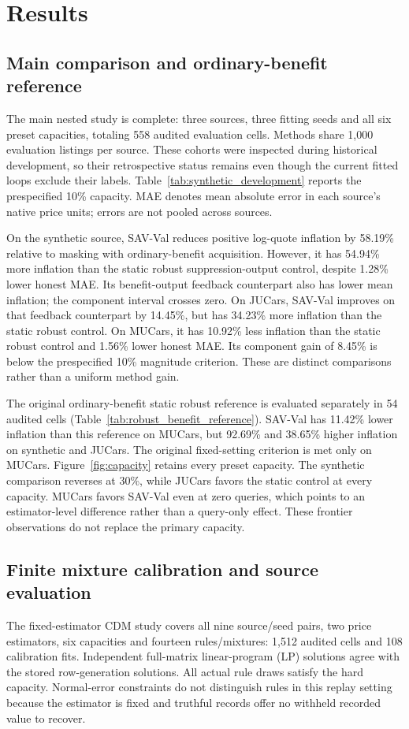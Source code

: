 \documentclass[pdflatex,sn-nature]{sn-jnl}
\begin{document}
\section{Results}
\label{sec:results}
\subsection{Main comparison and ordinary-benefit reference}
The main nested study is complete: three sources, three fitting seeds and all
six preset capacities, totaling 558 audited evaluation cells. Methods share
1,000 evaluation listings per source. These cohorts were inspected during
historical development, so their retrospective status remains even though the
current fitted loops exclude their labels. Table~\ref{tab:synthetic_development}
reports the prespecified 10\% capacity. MAE denotes mean absolute error in
each source's native price units; errors are not pooled across sources.

On the synthetic source, SAV-Val reduces positive log-quote inflation by
58.19\% relative to masking with ordinary-benefit acquisition. However, it has
54.94\% more inflation than the static robust suppression-output control,
despite 1.28\% lower honest MAE. Its benefit-output feedback counterpart also
has lower mean inflation; the component interval crosses zero.
On JUCars, SAV-Val improves on that feedback counterpart by 14.45\%, but has
34.23\% more inflation than the static robust control. On MUCars, it has
10.92\% less inflation than the static robust control and 1.56\% lower honest
MAE. Its component gain of 8.45\% is below the prespecified 10\% magnitude
criterion. These are distinct comparisons rather than a uniform method gain.

The original ordinary-benefit static robust reference is evaluated separately
in 54 audited cells (Table~\ref{tab:robust_benefit_reference}). SAV-Val has
11.42\% lower inflation than this reference on MUCars, but 92.69\% and
38.65\% higher inflation on synthetic and JUCars. The original fixed-setting
criterion is met only on MUCars. Figure~\ref{fig:capacity} retains every preset
capacity. The synthetic comparison reverses at 30\%, while JUCars favors the
static control at every capacity. MUCars favors SAV-Val even at zero queries,
which points to an estimator-level difference rather than a query-only effect.
These frontier observations do not replace the primary capacity.

\subsection{Finite mixture calibration and source evaluation}
The fixed-estimator CDM study covers all nine source/seed pairs, two price
estimators, six capacities and fourteen rules/mixtures: 1,512 audited cells
and 108 calibration fits. Independent full-matrix linear-program (LP)
solutions agree with the
stored row-generation solutions. All actual rule draws satisfy the hard
capacity. Normal-error constraints do not distinguish rules in this replay
setting because the estimator is fixed and truthful records offer no withheld
recorded value to recover.
\end{document}
